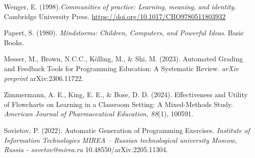 \documentclass[11pt,a4paper]{article}
\begin{document}
\begin{thebibliography}{99}
 Wenger, E. (1998).\textit{Communities of practice: Learning, meaning, and identity}. Cambridge University Press. \url{https://doi.org/10.1017/CBO9780511803932}

 Papert, S. (1980). \textit{Mindstorms: Children, Computers, and Powerful Ideas}. Basic Books.

 Messer, M., Brown, N.C.C., Kölling, M., \& Shi, M. (2023). Automated Grading 
and Feedback Tools for Programming Education: A Systematic Review. \textit{arXiv preprint} 
arXiv:2306.11722.

 Zimmermann, A. E., King, E. E., \& Bose, D. D. (2024). Effectiveness 
and Utility of Flowcharts on Learning in a Classroom Setting: A Mixed-Methods Study. 
\textit{American Journal of Pharmaceutical Education, 88}(1), 100591.

 Sovietov, P. (2022). Automatic Generation of Programming Exercises. \textit{Institute of Information Technologies MIREA – Russian technological university Moscow, Russia - sovetov@mirea.ru} 10.48550/arXiv.2205.11304. 

\end{thebibliography}
\end{document}

